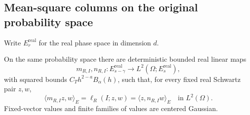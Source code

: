 \subsection{Mean-square columns on the original probability space}

Write $E_r^{\mathrm{real}}$ for the real phase space in dimension $d$.

\begin{proposition}\label{P:wave-square-columns}
  On the same probability space there are deterministic bounded real linear maps
  \[
    m_{R,I},n_{R,I}:E_{s-\gamma}^{\mathrm{real}}\longrightarrow
    L^2(\Omega;E_s^{\mathrm{real}}),
  \]
  with squared bounds $C_T h^{2-a}B_\alpha(h)$, such that, for every fixed real
  Schwartz pair $z,w$,
  \begin{equation}\label{E:variance-square-columns}
    \langle m_{R,I}z,w\rangle_E
    = \ell_R(I;z,w) = \langle z,n_{R,I}w\rangle_E
    \quad\text{in }L^2(\Omega).
  \end{equation}
  Fixed-vector values and finite families of values are centered Gaussian.
\end{proposition}


